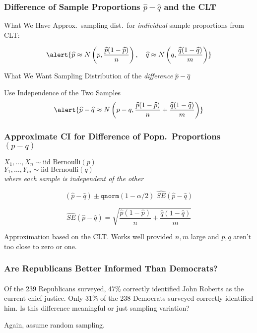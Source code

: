 

\begin{frame}
\frametitle{Difference of Sample Proportions $\widehat{p}-\widehat{q}$ and the CLT}
\begin{block}{What We Have}
Approx.\ sampling dist.\ for \emph{individual} sample proportions from CLT:

\[\alert{\widehat{p} \approx N\left(p, \frac{\widehat{p}(1 - \widehat{p})}{n}\right), \quad \widehat{q} \approx N\left(q, \frac{\widehat{q}(1 - \widehat{q})}{m}\right)}\]
\end{block}

\begin{block}{What We Want}
Sampling Distribution of the \emph{difference} $\widehat{p} - \widehat{q}$
\end{block}

\begin{block}{Use Independence of the Two Samples}
  \[\alert{\widehat{p} - \widehat{q} \approx N\left( p - q, \frac{\widehat{p}(1 - \widehat{p})}{n} + \frac{\widehat{q} (1 - \widehat{q})}{m}\right)}\]
\end{block}

\end{frame}
\begin{frame}

\frametitle{Approximate CI for Difference of Popn.\ Proportions $(p-q)$}


$X_1, \hdots, X_n \sim \mbox{iid Bernoulli}(p)$ \\
$Y_1, \hdots, Y_m \sim \mbox{iid Bernoulli}(q)$ \\
\emph{where each sample is independent of the other } 


  \[(\widehat{p} - \widehat{q}) \pm \texttt{qnorm}(1-\alpha/2)\; \widehat{SE}(\widehat{p} - \widehat{q})\] 

  \[
    \widehat{SE}(\widehat{p} - \widehat{q}) = \sqrt{\frac{\widehat{p}(1 - \widehat{p})}{n} + \frac{\widehat{q}(1 - \widehat{q})}{m}}
  \]


	\alert{Approximation based on the CLT. Works well provided $n,m$ large and $p,q$ aren't too close to zero or one.}

\end{frame}
\begin{frame}
\frametitle{Are Republicans Better Informed Than Democrats?}
\framesubtitle{}
Of the 239 Republicans surveyed, 47\% correctly identified John Roberts as the current chief justice. Only 31\% of the 238 Democrats surveyed correctly identified him. Is this difference meaningful or just sampling variation?

\vspace{2em}
\alert{Again, assume random sampling.}


\end{frame}

